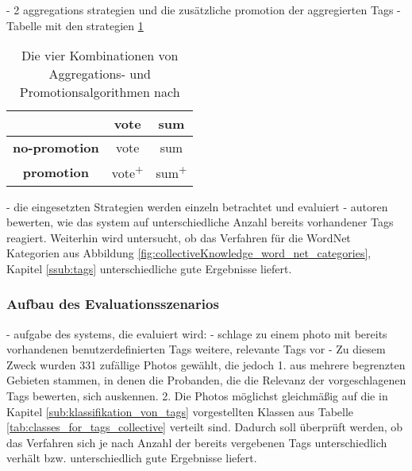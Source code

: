 - 2 aggregations strategien und die zusätzliche promotion der aggregierten Tags
- Tabelle mit den strategien \ref{tab:fourStrategiesBjoern}

\begin{table}[htbp]
  \centering
  \begin{tabular}{c|cc}
    \hline
     & \textbf{vote} & \textbf{sum}\\
    \hline
    \textbf{no-promotion} & vote & sum\\
    \hline
    \textbf{promotion} & vote\textsuperscript{+} & sum\textsuperscript{+}\\
    \hline
  \end{tabular}
  \caption{Die vier Kombinationen von Aggregations- und Promotionsalgorithmen nach \cite{collectiveKnowledge}}
  \label{tab:fourStrategiesBjoern}
\end{table}


- die eingesetzten Strategien werden einzeln betrachtet und evaluiert
- autoren bewerten, wie das system auf unterschiedliche Anzahl bereits vorhandener Tags reagiert. Weiterhin wird untersucht, ob das Verfahren für die WordNet Kategorien aus Abbildung \ref{fig:collectiveKnowledge_word_net_categories}, Kapitel \ref{ssub:tags} unterschiedliche gute Ergebnisse liefert.

\subsubsection{Aufbau des Evaluationsszenarios} %
\label{ssub:aufbau_des_evaluationsszenarios}

  - aufgabe des systems, die evaluiert wird:
    - schlage zu einem photo mit bereits vorhandenen benutzerdefinierten Tags weitere, relevante Tags vor
  - Zu diesem Zweck wurden 331 zufällige Photos gewählt, die jedoch 1. aus mehrere begrenzten Gebieten stammen, in denen die Probanden, die die Relevanz der vorgeschlagenen Tags bewerten, sich auskennen.
  2. Die Photos möglichst gleichmäßig auf die in Kapitel \ref{sub:klassifikation_von_tags} vorgestellten Klassen aus Tabelle \ref{tab:classes_for_tags_collective} verteilt sind. Dadurch soll überprüft werden, ob das Verfahren sich je nach Anzahl der bereits vergebenen Tags unterschiedlich verhält bzw. unterschiedlich gute Ergebnisse liefert.
  
